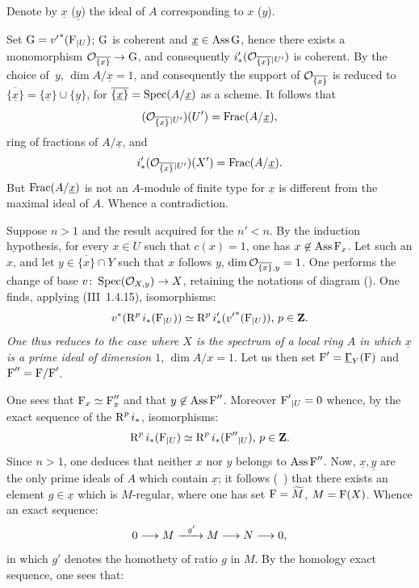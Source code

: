 Denote by $\underline x$ (\resp $\underline y$) the ideal of $A$ corresponding to $x$ (\resp $y$).

Set ${\operatorname{G}}={v'}^\ast({\operatorname{F}}{}_{|U})$; ${\operatorname{G}}$ is coherent and $\underline{x}\in\operatorname{Ass} {\operatorname{G}}$, hence there exists a monomorphism $\Oo_{\overline{\{x\}}}\to {\Ga}$, and consequently $i'_\ast({\mathcal O}_{\overline{\{x\}}}{}_{|U'})$ is coherent. By the choice of~$y$, $\dim A/\underline x=1$, and consequently the support of ${\mathcal O}_{\overline{\{x\}}}$ is reduced to $\overline{\{\underline x\}}= \{\underline x\}\cup \{\underline y\}$, for $\overline{\{\underline x\}}= \operatorname{Spec}(A/\underline x)$ as a scheme. It follows that
\[({\mathcal O}_{\overline{\{x\}}}{}_{|U'})(U')=\operatorname{Frac} (A/\underline x), \]
ring of fractions of $A/\underline x$, and
\[i'_\ast({\mathcal O}_{\overline{\{x\}}}{}_{|U'})(X')=\operatorname{Frac}(A/\underline x).
\]
But $\operatorname{Frac}(A/\underline x)$ is not an $A$-module of finite type for $\underline x$ is different from the maximal ideal of $A$. Whence a contradiction.

Suppose $n>1$ and the result acquired for the $n'<n$. By the induction hypothesis, for every $x\in U$ such that $c(x)=1$, one has $x\not\in\operatorname{Ass}{\operatorname{F}}_x$. Let such an $x$, and let $y\in\overline{\{x\}}\cap Y$ such that $x$ follows $y$, \ie $\dim{\mathcal O}_{\overline{\{x\}}, y}=1$. One performs the change of base $v\colon\Spec (\Oo_{X, y})\to X$, retaining the notations of diagram (). One finds, applying (\EGA III~1.4.15), isomorphisms:
\[v^\ast(\operatorname{R}^pi_\ast({\operatorname{F}}{}_{|U})) \simeq \operatorname{R}^pi'_\ast({v'}^\ast({\operatorname{F}}{}_{|U}))\text{, }p\in\mathbf{Z}.
\]
\indent\emph{One thus reduces to the case where $X$ is the spectrum of a local ring $A$ in which $\underline{x}$ is a prime ideal of dimension $1$}, \ie $\dim A/x=1$. Let us then set ${\operatorname{F}}'=\underline{\Gamma}_Y({\operatorname{F}})$ and ${\operatorname{F}}''={\operatorname{F}}/{\operatorname{F}}'$.

\noindent One sees that ${\operatorname{F}}_x\simeq {\operatorname{F}}''_x$ and that $y\not\in \operatorname{Ass}{\operatorname{F}}''$. Moreover ${\operatorname{F}}'{}_{|U}=0$ whence, by the exact sequence of the $\operatorname{R}^pi_\ast$, isomorphisms:
\[
\operatorname{R}^pi_\ast({\operatorname{F}}{}_{|U})\simeq \operatorname{R}^pi_\ast({\operatorname{F}}''{}_{|U})\text{, }p\in\mathbf{Z}.
\]
Since $n>1$, one deduces that neither $x$ nor $y$ belongs to $\operatorname{Ass} {\operatorname{F}}''$. Now, $\underline{x}, \underline{y}$ are the only prime ideals of $A$ which contain $\underline{x}$; it follows (~) that there exists an element $g\in \underline{x}$ which is $M$-regular, where one has set ${\operatorname{F}}=\widetilde{M}$, $M={\operatorname{F}}(X)$. Whence an exact sequence:
\[0\to M\lto{g'} M\to N \to 0,
\]
in which $g'$ denotes the homothety of ratio $g$ in $M$. By the homology exact sequence, one sees that:

